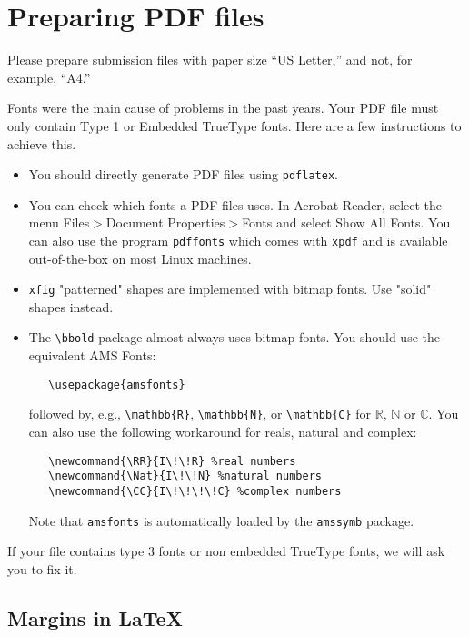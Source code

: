 \documentclass{article}
\begin{document}
\section{Preparing PDF files}


Please prepare submission files with paper size ``US Letter,'' and not, for
example, ``A4.''


Fonts were the main cause of problems in the past years. Your PDF file must only
contain Type 1 or Embedded TrueType fonts. Here are a few instructions to
achieve this.


\begin{itemize}


    \item You should directly generate PDF files using \verb+pdflatex+.


    \item You can check which fonts a PDF files uses.  In Acrobat Reader, select the
          menu Files$>$Document Properties$>$Fonts and select Show All Fonts. You can
          also use the program \verb+pdffonts+ which comes with \verb+xpdf+ and is
          available out-of-the-box on most Linux machines.


    \item \verb+xfig+ "patterned" shapes are implemented with bitmap fonts.  Use
          "solid" shapes instead.


    \item The \verb+\bbold+ package almost always uses bitmap fonts.  You should use
          the equivalent AMS Fonts:
          \begin{verbatim}
   \usepackage{amsfonts}
\end{verbatim}
          followed by, e.g., \verb+\mathbb{R}+, \verb+\mathbb{N}+, or \verb+\mathbb{C}+
          for $\mathbb{R}$, $\mathbb{N}$ or $\mathbb{C}$.  You can also use the following
          workaround for reals, natural and complex:
          \begin{verbatim}
   \newcommand{\RR}{I\!\!R} %real numbers
   \newcommand{\Nat}{I\!\!N} %natural numbers
   \newcommand{\CC}{I\!\!\!\!C} %complex numbers
\end{verbatim}
          Note that \verb+amsfonts+ is automatically loaded by the \verb+amssymb+ package.


\end{itemize}


If your file contains type 3 fonts or non embedded TrueType fonts, we will ask
you to fix it.


\subsection{Margins in \LaTeX{}}
\end{document}
